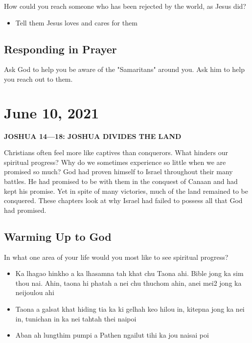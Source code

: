 \documentclass[11pt]{article}
\begin{document}
How could you reach someone who has been rejected by the world, as
Jesus did?
\begin{itemize}
\item Tell them Jesus loves and cares for them
\end{itemize}

\subsection{Responding in Prayer}
\label{sec:org636c97f}

Ask God to help you be aware of the "Samaritans" around you. Ask him
to help you reach out to them.




\section{June 10, 2021}
\label{sec:org7747e85}

\textbf{\textbf{JOSHUA 14—18: JOSHUA DIVIDES THE LAND}}

Christians often feel more like captives than conquerors. What hinders
our spiritual progress? Why do we sometimes experience so little when
we are promised so much? God had proven himself to Israel throughout
their many battles. He had promised to be with them in the conquest of
Canaan and had kept his promise. Yet in spite of many victories, much
of the land remained to be conquered. These chapters look at why
Israel had failed to possess all that God had promised.

\subsection{Warming Up to God}
\label{sec:orgf1056e0}

In what one area of your life would you most like to see spiritual
progress?

\begin{itemize}
\item Ka lhagao hinkho a ka lhasamna tah khat chu Taona ahi. Bible jong ka
sim thou nai. Ahin, taona hi phatah a nei chu thuchom ahin, anei
mei2 jong ka neijoulou ahi
\item Taona a galsat khat hiding tia ka ki gelhah keo hilou in, kitepna
jong ka nei in, tunichan in ka nei tahtah thei naipoi
\item Aban ah lungthim pumpi a Pathen ngailut tihi ka jou naisai poi
\end{itemize}
\end{document}

